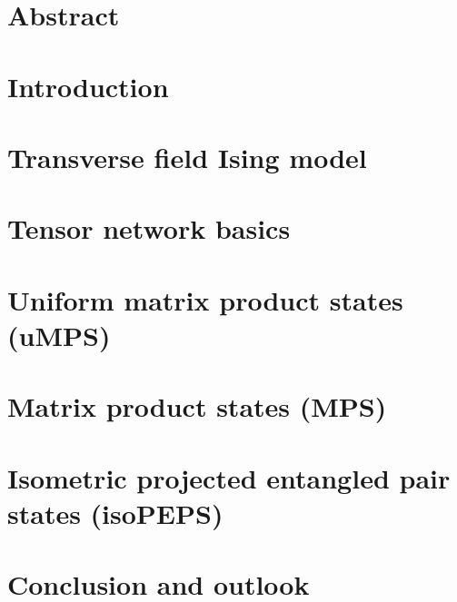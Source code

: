 \documentclass[12pt,a4paper]{book}
\begin{document}
\frontmatter

\chapter{Abstract} 
\label{ch:abstract}


\tableofcontents

\mainmatter

\chapter{Introduction} 
\label{ch:introduction}


\chapter{Transverse field Ising model}
\label{ch:tfi_model}


\chapter{Tensor network basics}
\label{ch:tensor_networks}


\chapter{Uniform matrix product states (uMPS)} 
\label{ch:umps}


\chapter{Matrix product states (MPS)} 
\label{ch:mps}


\chapter{Isometric projected entangled pair states (isoPEPS)} \label{ch:iso_peps}


\chapter{Conclusion and outlook}
\label{ch:conclusion}

\end{document}
